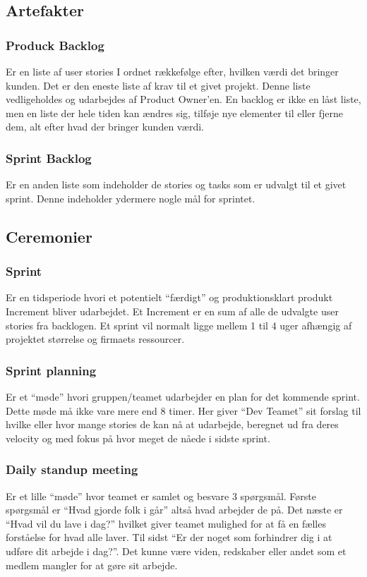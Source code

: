 \subsection{Artefakter}
\subsubsection{Produck Backlog}
Er en liste af user stories I ordnet rækkefølge efter, hvilken værdi det bringer kunden. 
Det er den eneste liste af krav til et givet projekt. Denne liste vedligeholdes og udarbejdes af 
Product Owner’en. En backlog er ikke en låst liste, men en liste der hele tiden kan ændres sig, 
tilføje nye elementer til eller fjerne dem, alt efter hvad der bringer kunden værdi. 

\subsubsection{Sprint Backlog}
Er en anden liste som indeholder de stories og tasks som er udvalgt til et givet sprint. Denne indeholder
ydermere nogle mål for sprintet. 

\subsection{Ceremonier}
\subsubsection{Sprint}
Er en tidsperiode hvori et potentielt “færdigt” og produktionsklart produkt Increment bliver udarbejdet. 
Et Increment er en sum af alle de udvalgte user stories fra backlogen. Et sprint vil normalt ligge mellem 1 til 4 uger 
afhængig af projektet størrelse og firmaets ressourcer.

\subsubsection{Sprint planning}
Er et “møde” hvori gruppen/teamet udarbejder en plan for det kommende sprint. Dette møde må ikke vare mere end 8 timer. 
Her giver “Dev Teamet” sit forslag til hvilke eller hvor mange stories de kan nå at udarbejde, beregnet ud fra deres velocity 
og med fokus på hvor meget de nåede i sidste sprint.

\subsubsection{Daily standup meeting}
Er et lille “møde” hvor teamet er samlet og besvare 3 spørgsmål. Første spørgsmål er “Hvad gjorde folk i går” 
altså hvad arbejder de på. Det næste er “Hvad vil du lave i dag?” hvilket giver teamet mulighed for at få en fælles 
forståelse for hvad alle laver. Til sidst “Er der noget som forhindrer dig i at udføre dit arbejde i dag?”. Det kunne være viden, 
redskaber eller andet som et medlem mangler for at gøre sit arbejde.

